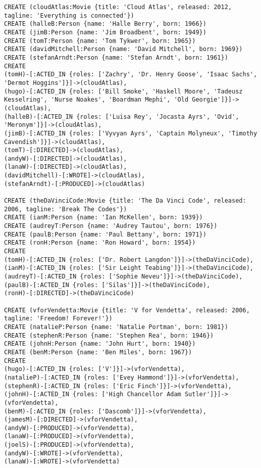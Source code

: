 \begin{lstlisting}
CREATE (cloudAtlas:Movie {title: 'Cloud Atlas', released: 2012, tagline: 'Everything is connected'})
CREATE (halleB:Person {name: 'Halle Berry', born: 1966})
CREATE (jimB:Person {name: 'Jim Broadbent', born: 1949})
CREATE (tomT:Person {name: 'Tom Tykwer', born: 1965})
CREATE (davidMitchell:Person {name: 'David Mitchell', born: 1969})
CREATE (stefanArndt:Person {name: 'Stefan Arndt', born: 1961})
CREATE
(tomH)-[:ACTED_IN {roles: ['Zachry', 'Dr. Henry Goose', 'Isaac Sachs', 'Dermot Hoggins']}]->(cloudAtlas),
(hugo)-[:ACTED_IN {roles: ['Bill Smoke', 'Haskell Moore', 'Tadeusz Kesselring', 'Nurse Noakes', 'Boardman Mephi', 'Old Georgie']}]->(cloudAtlas),
(halleB)-[:ACTED_IN {roles: ['Luisa Rey', 'Jocasta Ayrs', 'Ovid', 'Meronym']}]->(cloudAtlas),
(jimB)-[:ACTED_IN {roles: ['Vyvyan Ayrs', 'Captain Molyneux', 'Timothy Cavendish']}]->(cloudAtlas),
(tomT)-[:DIRECTED]->(cloudAtlas),
(andyW)-[:DIRECTED]->(cloudAtlas),
(lanaW)-[:DIRECTED]->(cloudAtlas),
(davidMitchell)-[:WROTE]->(cloudAtlas),
(stefanArndt)-[:PRODUCED]->(cloudAtlas)

CREATE (theDaVinciCode:Movie {title: 'The Da Vinci Code', released: 2006, tagline: 'Break The Codes'})
CREATE (ianM:Person {name: 'Ian McKellen', born: 1939})
CREATE (audreyT:Person {name: 'Audrey Tautou', born: 1976})
CREATE (paulB:Person {name: 'Paul Bettany', born: 1971})
CREATE (ronH:Person {name: 'Ron Howard', born: 1954})
CREATE
(tomH)-[:ACTED_IN {roles: ['Dr. Robert Langdon']}]->(theDaVinciCode),
(ianM)-[:ACTED_IN {roles: ['Sir Leight Teabing']}]->(theDaVinciCode),
(audreyT)-[:ACTED_IN {roles: ['Sophie Neveu']}]->(theDaVinciCode),
(paulB)-[:ACTED_IN {roles: ['Silas']}]->(theDaVinciCode),
(ronH)-[:DIRECTED]->(theDaVinciCode)

CREATE (vforVendetta:Movie {title: 'V for Vendetta', released: 2006, tagline: 'Freedom! Forever!'})
CREATE (natalieP:Person {name: 'Natalie Portman', born: 1981})
CREATE (stephenR:Person {name: 'Stephen Rea', born: 1946})
CREATE (johnH:Person {name: 'John Hurt', born: 1940})
CREATE (benM:Person {name: 'Ben Miles', born: 1967})
CREATE
(hugo)-[:ACTED_IN {roles: ['V']}]->(vforVendetta),
(natalieP)-[:ACTED_IN {roles: ['Evey Hammond']}]->(vforVendetta),
(stephenR)-[:ACTED_IN {roles: ['Eric Finch']}]->(vforVendetta),
(johnH)-[:ACTED_IN {roles: ['High Chancellor Adam Sutler']}]->(vforVendetta),
(benM)-[:ACTED_IN {roles: ['Dascomb']}]->(vforVendetta),
(jamesM)-[:DIRECTED]->(vforVendetta),
(andyW)-[:PRODUCED]->(vforVendetta),
(lanaW)-[:PRODUCED]->(vforVendetta),
(joelS)-[:PRODUCED]->(vforVendetta),
(andyW)-[:WROTE]->(vforVendetta),
(lanaW)-[:WROTE]->(vforVendetta)


\end{lstlisting}
